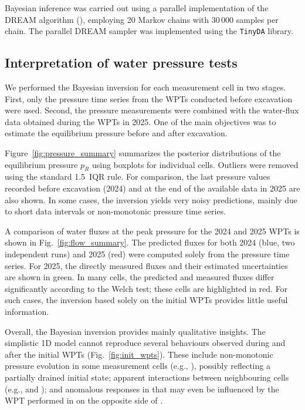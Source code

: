 Bayesian inference was carried out using a parallel implementation of the
DREAM algorithm (\cite{Vrugt_Markov_2016}), employing 20 Markov chains with
30\,000 samples per chain. The parallel DREAM sampler was implemented using
the \texttt{TinyDA} library.

\subsection{Interpretation of water pressure tests}
We performed the Bayesian inversion for each measurement cell in two stages. First,
only the pressure time series from the WPTs conducted before excavation were used.
Second, the pressure measurements were combined with the water-flux data obtained
during the WPTs in 2025. One of the main objectives was to estimate the equilibrium
pressure before and after excavation.


Figure~\ref{fig:pressure_summary} summarizes the posterior distributions of the
equilibrium pressure $p_R$ using boxplots for individual cells. Outliers were removed
using the standard 1.5~IQR rule. For comparison, the last pressure values recorded
before excavation (2024) and at the end of the available data in 2025 are also shown.
In some cases, the inversion yields very noisy predictions, mainly due to short data
intervals or non-monotonic pressure time series.

A comparison of water fluxes at the peak pressure for the 2024 and 2025 WPTs is shown
in Fig.~\ref{fig:flow_summary}. The predicted fluxes for both 2024 (blue, two independent runs) 
and 2025 (red) were computed solely from the pressure time series. For 2025, the directly
measured fluxes and their estimated uncertainties are shown in green. In many cells,
the predicted and measured fluxes differ significantly according to the Welch test;
these cells are highlighted in red. For such cases, the inversion based solely on the
initial WPTs provides little useful information.

Overall, the Bayesian inversion provides mainly qualitative insights. The simplistic 1D model cannot reproduce several behaviours observed during and after the initial WPTs (Fig.~\ref{fig:init_wpts}). These include non-monotonic pressure evolution in some 
 measurement cells (e.g., ), possibly reflecting a partially drained initial state; apparent interactions between neighbouring cells (e.g.,  and ); and anomalous responses in  that may even be influenced by the WPT performed in  on the opposite side of .

